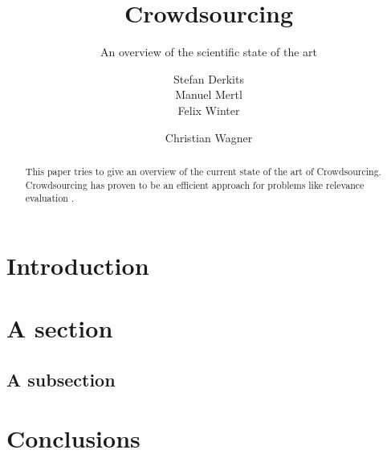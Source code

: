 \documentclass{acm_proc_article-sp}
\begin{document}
\title{Crowdsourcing}
\subtitle{An overview of the scientific state of the art}

\author{
\alignauthor Stefan Derkits\\
\alignauthor Manuel Mertl\\
\alignauthor Felix Winter\\
\and  %
\alignauthor Christian Wagner\\
}

\maketitle
\begin{abstract}
This paper tries to give an overview of the current state of the art of Crowdsourcing. Crowdsourcing has proven to be an efficient approach for problems like relevance evaluation \cite{alonso2008crowdsourcing}.
\end{abstract}





\section{Introduction}

\section{A section}


\subsection{A subsection}


\section{Conclusions}



\end{document}
